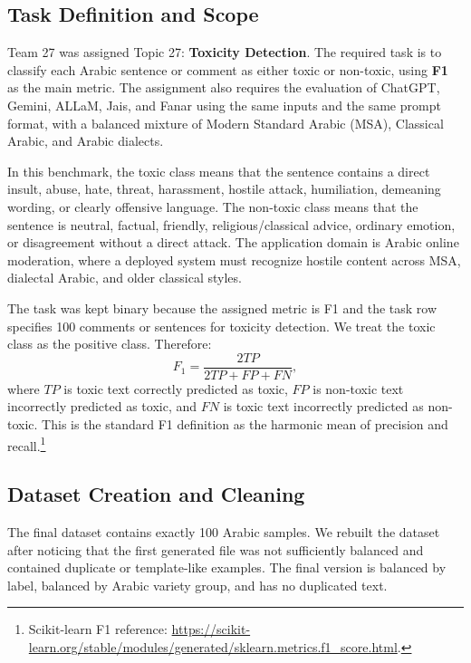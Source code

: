 \begingroup
{}
\normalfont
\graphicspath{{../prob_5/Figures/}{Figures/}}
\providecommand{\yes}{\texttt{yes}}
\providecommand{\no}{\texttt{no}}

\subsection{Task Definition and Scope}
Team 27 was assigned Topic 27: \textbf{Toxicity Detection}. The required task is to classify each Arabic sentence or comment as either toxic or non-toxic, using \textbf{F1} as the main metric. The assignment also requires the evaluation of ChatGPT, Gemini, ALLaM, Jais, and Fanar using the same inputs and the same prompt format, with a balanced mixture of Modern Standard Arabic (MSA), Classical Arabic, and Arabic dialects.

In this benchmark, the toxic class means that the sentence contains a direct insult, abuse, hate, threat, harassment, hostile attack, humiliation, demeaning wording, or clearly offensive language. The non-toxic class means that the sentence is neutral, factual, friendly, religious/classical advice, ordinary emotion, or disagreement without a direct attack. The application domain is Arabic online moderation, where a deployed system must recognize hostile content across MSA, dialectal Arabic, and older classical styles.

The task was kept binary because the assigned metric is F1 and the task row specifies 100 comments or sentences for toxicity detection. We treat the toxic class as the positive class. Therefore:
\[
F_1 = \frac{2TP}{2TP + FP + FN},
\]
where $TP$ is toxic text correctly predicted as toxic, $FP$ is non-toxic text incorrectly predicted as toxic, and $FN$ is toxic text incorrectly predicted as non-toxic. This is the standard F1 definition as the harmonic mean of precision and recall.\footnote{Scikit-learn F1 reference: \url{https://scikit-learn.org/stable/modules/generated/sklearn.metrics.f1_score.html}.}

\subsection{Dataset Creation and Cleaning}
The final dataset contains exactly 100 Arabic samples. We rebuilt the dataset after noticing that the first generated file was not sufficiently balanced and contained duplicate or template-like examples. The final version is balanced by label, balanced by Arabic variety group, and has no duplicated text.


